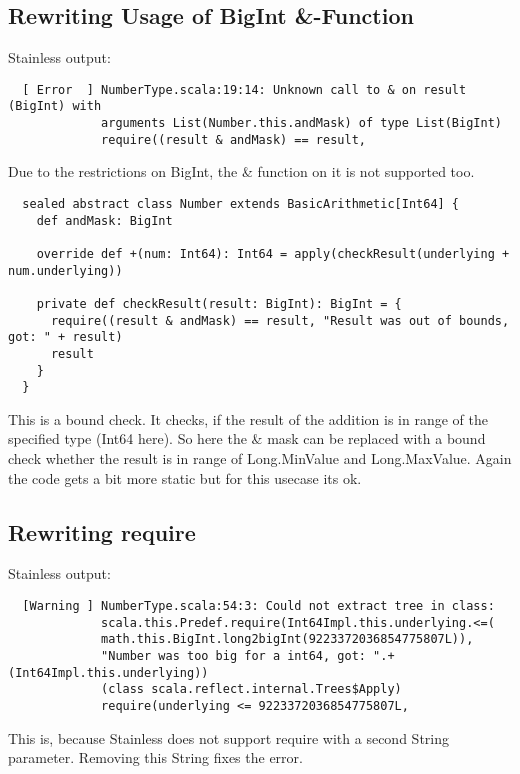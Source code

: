 \subsection{Rewriting Usage of BigInt \&-Function}
Stainless output:
\begin{lstlisting}
  [ Error  ] NumberType.scala:19:14: Unknown call to & on result (BigInt) with
             arguments List(Number.this.andMask) of type List(BigInt)
             require((result & andMask) == result,
\end{lstlisting}
Due to the restrictions on BigInt, the \& function on it is not supported too.
\begin{lstlisting}
  sealed abstract class Number extends BasicArithmetic[Int64] {
    def andMask: BigInt

    override def +(num: Int64): Int64 = apply(checkResult(underlying + num.underlying))

    private def checkResult(result: BigInt): BigInt = {
      require((result & andMask) == result, "Result was out of bounds, got: " + result)
      result
    }
  }
\end{lstlisting}
This is a bound check.
It checks, if the result of the addition is in range of the specified type (Int64 here).
So here the \& mask can be replaced with a bound check whether the result is in range of Long.MinValue and Long.MaxValue.
Again the code gets a bit more static but for this usecase its ok.

\subsection{Rewriting require}
Stainless output:
\begin{lstlisting}
  [Warning ] NumberType.scala:54:3: Could not extract tree in class:
             scala.this.Predef.require(Int64Impl.this.underlying.<=(
             math.this.BigInt.long2bigInt(9223372036854775807L)),
             "Number was too big for a int64, got: ".+(Int64Impl.this.underlying))
             (class scala.reflect.internal.Trees$Apply)
             require(underlying <= 9223372036854775807L,
\end{lstlisting}
This is, because Stainless does not support require with a second String parameter.
Removing this String fixes the error.

